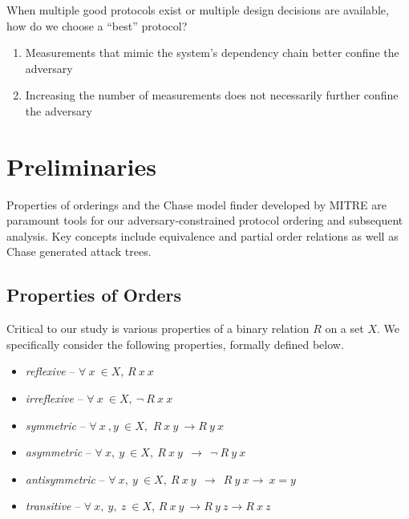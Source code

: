 \documentclass[runningheads]{llncs}
\theoremstyle{definition}
\newcommand{\squash}{\itemsep=0pt\parskip=0pt}
\begin{document}
When multiple good protocols exist or multiple design decisions are
available, how do we choose a ``best'' protocol?

\begin{enumerate}
    \item Measurements that mimic the system's dependency chain better confine the adversary
    \item Increasing the number of measurements does not necessarily further confine the adversary 
\end{enumerate}



\section{Preliminaries}

Properties of orderings and the Chase model finder developed by MITRE \cite{Ramsdell:2020:Chase} are paramount tools for our adversary-constrained protocol ordering and subsequent analysis. Key concepts include equivalence and partial order relations as well as Chase generated attack trees. 

\subsection*{Properties of Orders}

Critical to our study is various properties of a binary relation $R$ on a set $X$. We specifically consider the following properties, formally defined below.

\begin{itemize}
    \squash
    \item \emph{reflexive} -- $ \forall\: x\: \in X$, $R\: x\: x$
    \item \emph{irreflexive} -- $ \forall \: x\: \in X, \: \neg \: R\: x\: x$
    \item \emph{symmetric} -- $ \forall\: x\: , y\: \in X,$ $R\: x\: y\:\rightarrow R\: y\: x$
    \item \emph{asymmetric} --  $\forall\: x,\: y\:\in X,\: R\: x\: y\:\: \rightarrow  \:\: \neg \:R\: y\: x $  
    \item \emph{antisymmetric} --  $\forall\: x,\: y\:\in X,\: R\: x\: y\:\: \rightarrow \:\: R\: y\: x \rightarrow \:x = y$ 
    \item \emph{transitive} -- $ \forall\: x,\: y,\: z\:\in X$, $R\: x\: y\: \rightarrow R\: y\: z \rightarrow R\: x\: z$
\end{itemize}
\end{document}

